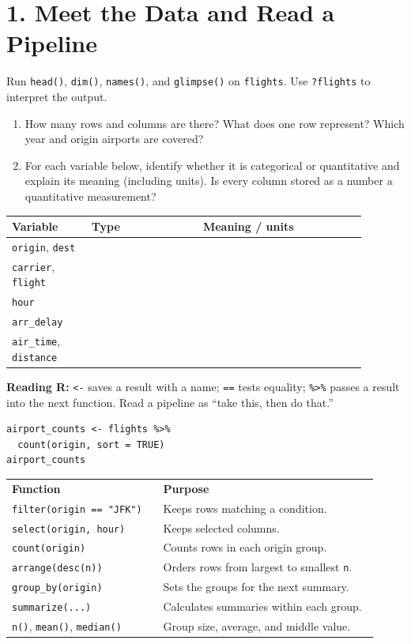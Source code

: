 \documentclass[11pt]{article}
\begin{document}
\newpage
\section*{1. Meet the Data and Read a Pipeline}
Run \texttt{head()}, \texttt{dim()}, \texttt{names()}, and \texttt{glimpse()} on \texttt{flights}. Use \texttt{?flights} to interpret the output.
\begin{enumerate}
\item How many rows and columns are there? What does one row represent? Which year and origin airports are covered?
\item For each variable below, identify whether it is categorical or quantitative and explain its meaning (including units). Is every column stored as a number a quantitative measurement?
\end{enumerate}
\begin{center}
\renewcommand{\arraystretch}{1.65}
\begin{tabular}{|p{0.20\linewidth}|p{0.28\linewidth}|p{0.41\linewidth}|}
\hline
\textbf{Variable} & \textbf{Type} & \textbf{Meaning / units} \\
\hline
\texttt{origin}, \texttt{dest} & & \\
\hline
\texttt{carrier}, \texttt{flight} & & \\
\hline
\texttt{hour} & & \\
\hline
\texttt{arr\_delay} & & \\
\hline
\texttt{air\_time}, \texttt{distance} & & \\
\hline
\end{tabular}
\end{center}
\textbf{Reading R:} \texttt{<-} saves a result with a name; \texttt{==} tests equality; \texttt{\%>\%} passes a result into the next function. Read a pipeline as ``take this, then do that.''
\begin{lstlisting}
airport_counts <- flights %>%
  count(origin, sort = TRUE)
airport_counts
\end{lstlisting}
\begin{center}
\renewcommand{\arraystretch}{1.2}
\begin{tabular}{p{0.38\linewidth}p{0.54\linewidth}}
\textbf{Function} & \textbf{Purpose} \\
\texttt{filter(origin == "JFK")} & Keeps rows matching a condition. \\
\texttt{select(origin, hour)} & Keeps selected columns. \\
\texttt{count(origin)} & Counts rows in each origin group. \\
\texttt{arrange(desc(n))} & Orders rows from largest to smallest \texttt{n}. \\
\texttt{group\_by(origin)} & Sets the groups for the next summary. \\
\texttt{summarize(...)} & Calculates summaries within each group. \\
\texttt{n()}, \texttt{mean()}, \texttt{median()} & Group size, average, and middle value. \\
\end{tabular}
\end{center}
\end{document}
